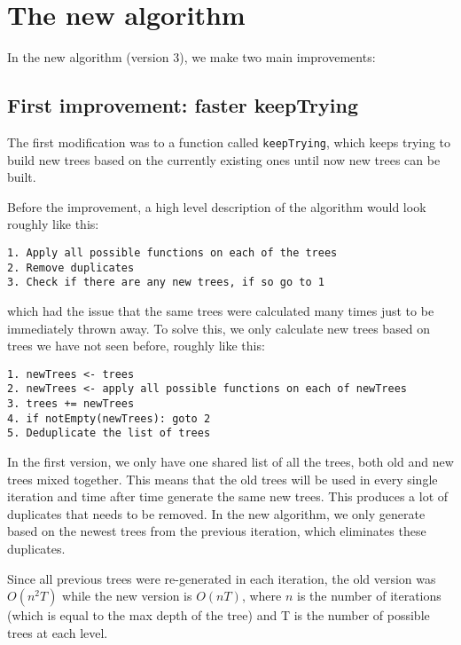 \chapter{The new algorithm}


In the new algorithm (version 3), we make two main improvements:


\section{First improvement: faster keepTrying}

The first modification was to a function called \texttt{keepTrying}, which keeps trying to build new trees based on the currently existing ones until now new trees can be built.

Before the improvement, a high level description of the algorithm would look roughly like this:
\begin{verbatim}
1. Apply all possible functions on each of the trees
2. Remove duplicates
3. Check if there are any new trees, if so go to 1
\end{verbatim}

which had the issue that the same trees were calculated many times just to be immediately thrown away. To solve this, we only calculate new trees based on trees we have not seen before, roughly like this:

\begin{verbatim}
1. newTrees <- trees
2. newTrees <- apply all possible functions on each of newTrees
3. trees += newTrees
4. if notEmpty(newTrees): goto 2
5. Deduplicate the list of trees
\end{verbatim}

In the first version, we only have one shared list of all the trees, both old and new trees mixed together. This means that the old trees will be used in every single iteration and time after time generate the same new trees. This produces a lot of duplicates that needs to be removed. In the new algorithm, we only generate based on the newest trees from the previous iteration, which eliminates these duplicates.

Since all previous trees were re-generated in each iteration, the old version was $O(n^2T)$ while the new version is $O(nT)$, where $n$ is the number of iterations (which is equal to the max depth of the tree) and T is the number of possible trees at each level.

